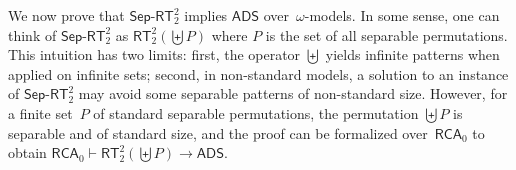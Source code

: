 \documentclass{article}
\numberwithin{theorem}{section}
\newtheorem{proposition}[theorem]{Proposition}
\def\L{\mathcal{L}}
\newcommand{\RCA}[0]{\mathsf{RCA}}
\newcommand{\ADS}[0]{\mathsf{ADS}}
\newcommand{\RT}[0]{\mathsf{RT}}
\newcommand{\SepRT}[0]{\mathsf{Sep}\mbox{-}\mathsf{RT}}
\newcommand{\NN}[0]{\mathbb{N}}
\begin{document}
We now prove that $\SepRT^2_2$ implies $\ADS$ over~$\omega$-models. In some sense, one can think of $\SepRT^2_2$ as $\RT^2_2(\biguplus P)$ where $P$ is the set of all separable permutations. This intuition has two limits: first, the operator $\biguplus$ yields infinite patterns when applied on infinite sets; second, in non-standard models, a solution to an instance of $\SepRT^2_2$ may avoid some separable patterns of non-standard size. However, for a finite set~$P$ of standard separable permutations, the permutation $\biguplus P$ is separable and of standard size, and the proof can be formalized over~$\RCA_0$ to obtain $\RCA_0 \vdash \RT^2_2(\biguplus P) \to \ADS$.


\end{document}
